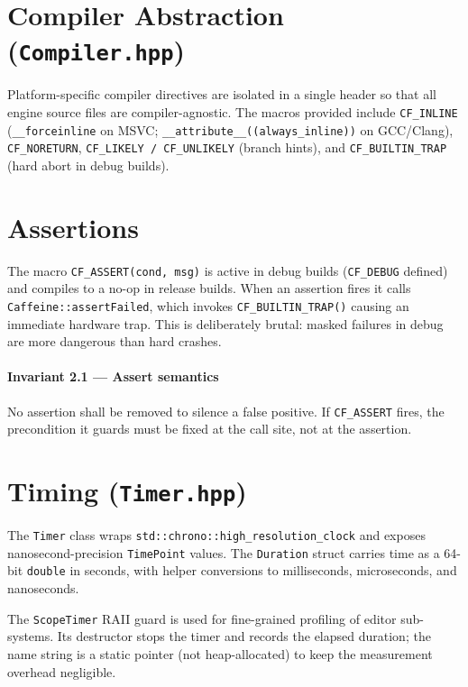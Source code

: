 \section{Compiler Abstraction (\texttt{Compiler.hpp})}

Platform-specific compiler directives are isolated in a single header so
that all engine source files are compiler-agnostic. The macros provided
include \texttt{CF\_INLINE} (\texttt{\_\_forceinline} on MSVC;
\texttt{\_\_attribute\_\_((always\_inline))} on GCC/Clang),
\texttt{CF\_NORETURN}, \texttt{CF\_LIKELY / CF\_UNLIKELY} (branch hints),
and \texttt{CF\_BUILTIN\_TRAP} (hard abort in debug builds).

\section{Assertions}

The macro \texttt{CF\_ASSERT(cond, msg)} is active in debug builds
(\texttt{CF\_DEBUG} defined) and compiles to a no-op in release builds.
When an assertion fires it calls \texttt{Caffeine::assertFailed}, which
invokes \texttt{CF\_BUILTIN\_TRAP()} causing an immediate hardware trap.
This is deliberately brutal: masked failures in debug are more dangerous
than hard crashes.


\paragraph{Invariant 2.1 --- Assert semantics}

  No assertion shall be removed to silence a false positive.
  If \texttt{CF\_ASSERT} fires, the precondition it guards must be fixed at
  the call site, not at the assertion.



\section{Timing (\texttt{Timer.hpp})}

The \texttt{Timer} class wraps \texttt{std::chrono::high\_resolution\_clock}
and exposes nanosecond-precision \texttt{TimePoint} values. The
\texttt{Duration} struct carries time as a 64-bit \texttt{double} in seconds,
with helper conversions to milliseconds, microseconds, and nanoseconds.

The \texttt{ScopeTimer} RAII guard is used for fine-grained profiling of
editor sub-systems. Its destructor stops the timer and records the elapsed
duration; the name string is a static pointer (not heap-allocated) to keep
the measurement overhead negligible.
